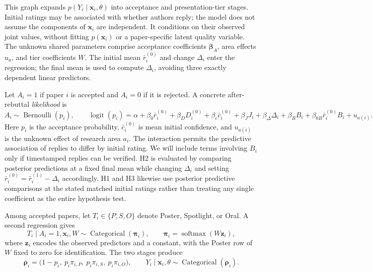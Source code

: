 \documentclass[11pt]{article}
\begin{document}
This graph expands $p(Y_i\mid\mathbf{x}_i,\theta)$ into acceptance and presentation-tier stages. Initial ratings may be associated with whether authors reply; the model does not assume the components of $\mathbf{x}_i$ are independent. It conditions on their observed joint values, without fitting $p(\mathbf{x}_i)$ or a paper-specific latent quality variable. The unknown shared parameters comprise acceptance coefficients $\boldsymbol\beta_A$, area effects $u_a$, and tier coefficients $W$. The initial mean $\bar r_i^{(0)}$ and change $\Delta_i$ enter the regression; the final mean is used to compute $\Delta_i$, avoiding three exactly dependent linear predictors.

Let $A_i=1$ if paper $i$ is accepted and $A_i=0$ if it is rejected. A concrete after-rebuttal \emph{likelihood} is
\begin{equation*}
 A_i\sim\operatorname{Bernoulli}(p_i),\qquad
 \operatorname{logit}(p_i)
 =\alpha+\beta_0\bar r_i^{(0)}+\beta_D D_i^{(0)}
  +\beta_c\bar c_i^{(0)}+\beta_J J_i
  +\beta_{\Delta}\Delta_i+\beta_B B_i
  +\beta_{0B}\bar r_i^{(0)}B_i+u_{a(i)}.
\end{equation*}
Here $p_i$ is the acceptance probability, $\bar c_i^{(0)}$ is mean initial confidence, and $u_{a(i)}$ is the unknown effect of research area $a_i$. The interaction permits the predictive association of replies to differ by initial rating. We will include terms involving $B_i$ only if timestamped replies can be verified. H2 is evaluated by comparing posterior predictions at a fixed final mean while changing $\Delta_i$ and setting $\bar r_i^{(0)}=\bar r_i^{(1)}-\Delta_i$ accordingly. H1 and H3 likewise use posterior predictive comparisons at the stated matched initial ratings rather than treating any single coefficient as the entire hypothesis test.

Among accepted papers, let $T_i\in\{P,S,O\}$ denote Poster, Spotlight, or Oral. A second regression gives
\begin{equation*}
 T_i\mid A_i=1,\mathbf{x}_i,W\sim\operatorname{Categorical}(\boldsymbol\pi_i),
 \qquad \boldsymbol\pi_i=\operatorname{softmax}(W\mathbf{z}_i),
\end{equation*}
where $\mathbf{z}_i$ encodes the observed predictors and a constant, with the Poster row of $W$ fixed to zero for identification. The two stages produce
\begin{equation*}
 \boldsymbol\rho_i=\bigl(1-p_i,\ p_i\pi_{i,P},\ p_i\pi_{i,S},\ p_i\pi_{i,O}\bigr),
 \qquad Y_i\mid\mathbf{x}_i,\theta\sim\operatorname{Categorical}(\boldsymbol\rho_i).
\end{equation*}
\end{document}
